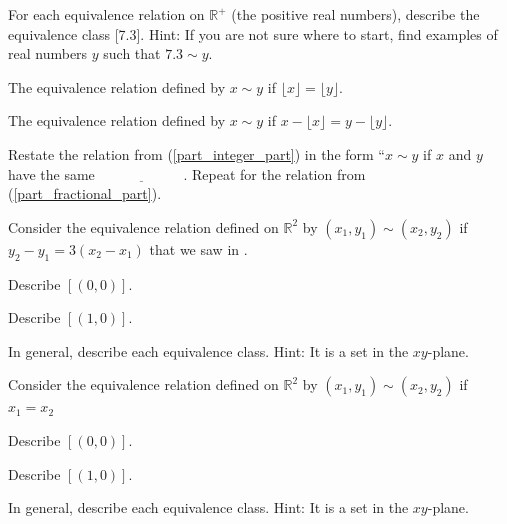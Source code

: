 \begin{exer}[\exerP] %
\label{exer_equiv_classes_floor}
    For each equivalence relation on $\mathbb{R}^+$ (the positive real numbers), describe the equivalence class [7.3].  Hint: If you are  not sure where to start, find examples of real numbers $y$ such that $7.3 \sim y$.
        \begin{exerpart}
            \item \label{part_integer_part} The equivalence relation defined by $x \sim y$ if $\lfloor x \rfloor = \lfloor y \rfloor$. 
            \item \label{part_fractional_part} The equivalence relation defined by $x \sim y$ if $x-\lfloor x \rfloor = y-\lfloor y \rfloor$.
            \item Restate the relation from (\ref{part_integer_part}) in the form ``$x \sim y$ if $x$ and $y$ have the same $\underline{\hspace{1in}}$.  Repeat for the relation from (\ref{part_fractional_part}). 
        \end{exerpart}   
\end{exer}

\begin{exer}[\exerP] %
\label{exer_equiv_classes_slope3}
    Consider the equivalence relation defined on $\mathbb{R}^2$ by $(x_1,y_1) \sim (x_2,y_2)$ if  $y_2-y_1=3(x_2-x_1)$ that we saw in  .
        \begin{exerpart}
            \item Describe $[(0,0)]$.
            \item Describe $[(1,0)]$.
            \item In general, describe each equivalence class.  Hint: It is a set in the $xy$-plane.
        \end{exerpart}
\end{exer}

\begin{exer}[\exerP] %
\label{exer_equiv_classes_first_coord}
    Consider the equivalence relation defined on $\mathbb{R}^2$ by $(x_1,y_1) \sim (x_2,y_2)$ if  $x_1=x_2$
        \begin{exerpart}
            \item Describe $[(0,0)]$.
            \item Describe $[(1,0)]$.
            \item In general, describe each equivalence class. Hint: It is a set in the $xy$-plane.
        \end{exerpart}
\end{exer}

